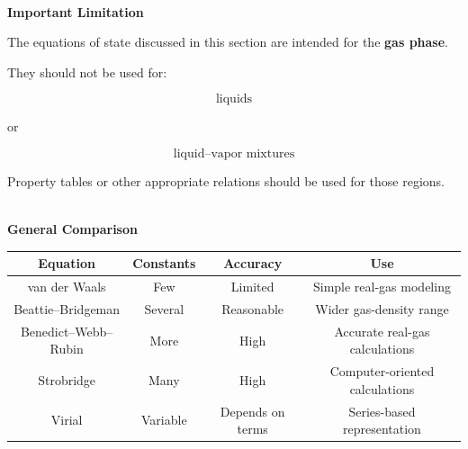 \documentclass[12pt]{article}
\begin{document}
\textbf{\\ Important Limitation}

The equations of state discussed in this section are intended for the \textbf{gas phase}.

They should not be used for:

\begin{equation*}
\boxed{
\text{liquids}
}
\end{equation*}

or

\begin{equation*}
\boxed{
\text{liquid--vapor mixtures}
}
\end{equation*}

Property tables or other appropriate relations should be used for those regions.

\textbf{\\ General Comparison}

\begin{center}
\begin{tabular}{|c|c|c|c|}
\hline
\textbf{Equation} & \textbf{Constants} & \textbf{Accuracy} & \textbf{Use} \\
\hline
van der Waals & Few & Limited & Simple real-gas modeling \\
\hline
Beattie--Bridgeman & Several & Reasonable & Wider gas-density range \\
\hline
Benedict--Webb--Rubin & More & High & Accurate real-gas calculations \\
\hline
Strobridge & Many & High & Computer-oriented calculations \\
\hline
Virial & Variable & Depends on terms & Series-based representation \\
\hline
\end{tabular}
\end{center}
\end{document}
